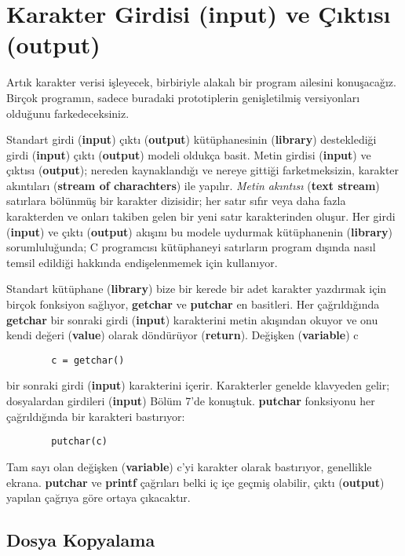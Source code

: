 \documentclass[a4paper,12pt,oneside]{book}
\begin{document}
\section{Karakter Girdisi (input) ve Çıktısı (output)}

Artık karakter verisi işleyecek, birbiriyle alakalı bir program ailesini konuşacağız. Birçok programın, sadece buradaki prototiplerin genişletilmiş versiyonları olduğunu farkedeceksiniz.
\par Standart girdi (\textbf{input}) çıktı (\textbf{output}) kütüphanesinin (\textbf{library}) desteklediği girdi (\textbf{input}) çıktı (\textbf{output}) modeli oldukça basit. Metin girdisi (\textbf{input}) ve çıktısı (\textbf{output}); nereden kaynaklandığı ve nereye gittiği farketmeksizin, karakter akıntıları (\textbf{stream of charachters}) ile yapılır. \textit{Metin akıntısı} (\textbf{text stream}) satırlara bölünmüş bir karakter dizisidir; her satır sıfır veya daha fazla karakterden ve onları takiben gelen bir yeni satır karakterinden oluşur. Her girdi (\textbf{input}) ve çıktı (\textbf{output}) akışını bu modele uydurmak kütüphanenin (\textbf{library}) sorumluluğunda; C programcısı kütüphaneyi satırların program dışında nasıl temsil edildiği hakkında endişelenmemek için kullanıyor.
\par Standart kütüphane (\textbf{library}) bize bir kerede bir adet karakter yazdırmak için birçok fonksiyon sağlıyor, \textbf{getchar} ve \textbf{putchar} en basitleri. Her çağrıldığında \textbf{getchar} bir sonraki girdi (\textbf{input}) karakterini metin akışından okuyor ve onu kendi değeri (\textbf{value}) olarak döndürüyor (\textbf{return}). Değişken (\textbf{variable}) c
\begin{lstlisting}
		c = getchar()
\end{lstlisting}
bir sonraki girdi (\textbf{input}) karakterini içerir. Karakterler genelde klavyeden gelir; dosyalardan girdileri (\textbf{input}) Bölüm 7'de konuştuk.
\textbf{putchar} fonksiyonu  her çağrıldığında bir karakteri bastırıyor:
\begin{lstlisting}
		putchar(c)
\end{lstlisting}
Tam sayı olan değişken (\textbf{variable}) c'yi karakter olarak bastırıyor, genellikle ekrana. \textbf{putchar} ve \textbf{printf} çağrıları belki iç içe geçmiş olabilir, çıktı (\textbf{output}) yapılan çağrıya göre ortaya çıkacaktır. \pagebreak

\subsection{Dosya Kopyalama}
\end{document}
